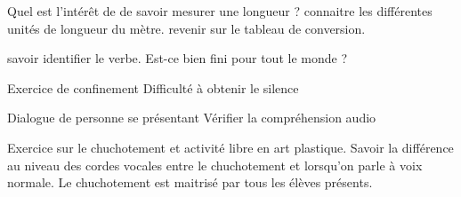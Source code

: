 \documentclass{article}
\begin{document}
	\dis\cma{} Quel est l’intérêt de de savoir mesurer une longueur ?
	\obj connaitre les différentes unités de longueur du mètre.
	\bil revenir sur le tableau de conversion.
	
	\dis\cfr{}
	\obj savoir identifier le verbe.
	\bil Est-ce bien fini pour tout le monde ?

	\dIs\cge{} Exercice de confinement
	\bil Difficulté à obtenir le silence
	
	\dIs\cen{} Dialogue de personne se présentant
	\obj Vérifier la compréhension audio
	
	
	\dIs\car{} Exercice sur le chuchotement et activité libre en art plastique.
	\obj Savoir la différence au niveau des cordes vocales entre le chuchotement et lorsqu’on parle à voix normale.
	\bil Le chuchotement est maitrisé par tous les élèves présents.
	
	
	
	
	
	
	\setlength{\parskip}{0ex}
	\tableofcontents
\end{document}
